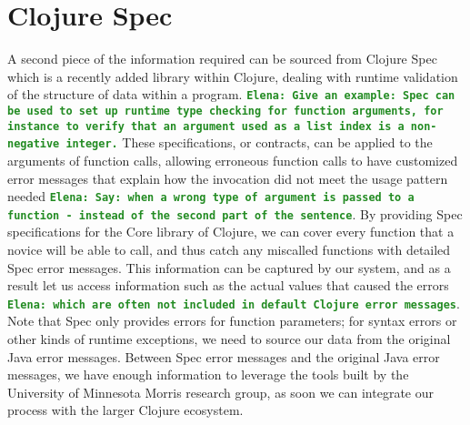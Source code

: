 \documentclass[12pt]{article}
\newcommand{\comment}[1]{{\bf \tt  {#1}}}
\newcommand{\emcomment}[1]{\textcolor{ForestGreen}{\comment{Elena: {#1}}}}
\begin{document}
\section{Clojure Spec}
A second piece of the information required can be sourced from Clojure Spec~\cite{spec}
which is a recently added library within Clojure, dealing with runtime validation of
the structure of data within a program. 
\emcomment{Give an example: Spec can be used to set up runtime
type checking for function arguments, for instance to verify that an argument used 
as a list index is a non-negative integer.}
These specifications, or contracts, can be applied to
 the arguments of function calls, allowing erroneous function calls to have
customized error messages that explain how the invocation did not meet the usage pattern
 needed \emcomment{Say: when a wrong type of argument is passed to a function - instead of the second part of the sentence}. 
By providing Spec specifications for the Core library of Clojure,
 we can cover every function that a novice will be able to call, and thus catch
 any miscalled functions with detailed Spec error messages.
 This information can be captured by our system, and as a result
 let us access information such as the actual values that caused the errors 
\emcomment{which are often not included in default Clojure error messages}.
Note that Spec only provides errors for function parameters; for syntax errors or other kinds of 
runtime exceptions, we need to source our data from the original Java error messages.
Between Spec error messages and the original Java error messages, we have enough
information to leverage the tools built by the
 University of Minnesota Morris research group, as soon we can integrate
 our process with the larger Clojure ecosystem.
\end{document}
